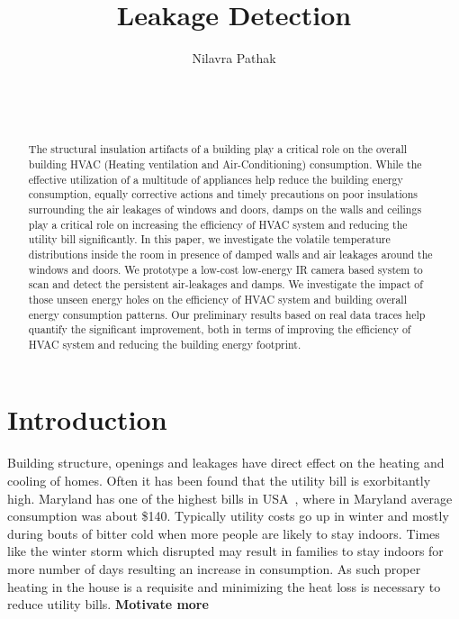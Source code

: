 \documentclass{sig-alternate}
\begin{document}
 

\title{Leakage Detection}
\author{
  \alignauthor Nilavra Pathak\\
    \\
    \\
    \\ 
}

\maketitle

\begin{abstract}
The structural insulation artifacts of a building play a critical role on the overall building HVAC (Heating ventilation and Air-Conditioning) consumption. While the effective utilization of a multitude of appliances help reduce the building energy consumption, equally corrective actions and timely precautions on poor insulations surrounding the air leakages of windows and doors, damps on the walls and ceilings play a critical role on increasing the efficiency of HVAC system and reducing the utility bill significantly. In this paper, we investigate the volatile temperature distributions inside the room in presence of damped walls and air leakages around the windows and doors. We prototype a low-cost low-energy IR camera based system to scan and detect the persistent air-leakages and damps. We investigate the impact of those unseen energy holes on the efficiency of HVAC system and building overall energy consumption patterns. Our preliminary results based on real data traces help quantify the significant improvement, both in terms of improving the efficiency of HVAC system and reducing the building energy footprint.
\end{abstract}



\section{Introduction}

 \indent Building structure, openings and leakages have direct effect on the heating and cooling of homes. Often it has been found that the utility bill is exorbitantly high. Maryland has one of the highest bills in USA~\cite{EIA2014}, where in Maryland average consumption was about \$140. Typically utility costs go up in winter and mostly during bouts of bitter cold when more people are likely to stay indoors. Times like the winter storm which disrupted may result in families to stay indoors for more number of days resulting an increase in consumption. As such proper heating in the house is a requisite and minimizing the heat loss is necessary to reduce utility bills. {\bf Motivate more}
 
\end{document}
